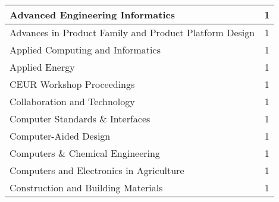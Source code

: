 \begin{longtable}{|p{11cm}|c|}
	Advanced Engineering Informatics                                                                                                                                                        & 1        \\ \hline
	Advances in Product Family and Product Platform Design                                                                                                                                  & 1        \\ \hline
	Applied Computing and Informatics                                                                                                                                                       & 1        \\ \hline
	Applied Energy                                                                                                                                                                          & 1        \\ \hline
	CEUR Workshop Proceedings                                                                                                                                                               & 1        \\ \hline
	Collaboration and Technology                                                                                                                                                            & 1        \\ \hline
	Computer Standards \& Interfaces                                                                                                                                                        & 1        \\ \hline
	Computer-Aided Design                                                                                                                                                                   & 1        \\ \hline
	Computers \& Chemical Engineering                                                                                                                                                       & 1        \\ \hline
	Computers and Electronics in Agriculture                                                                                                                                                & 1        \\ \hline
	Construction and Building Materials                                                                                                                                                     & 1        \\ \hline

\end{longtable}
